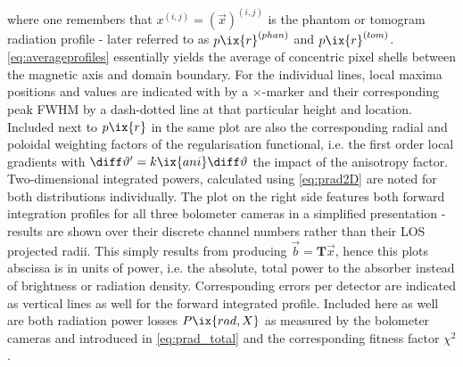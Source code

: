           where one remembers that $x^{\left(i,j\right)}=\left(\vec{x}\right)^{\left(i,j\right)}$ is the phantom or tomogram radiation profile - later referred to as $p\ix{r}^{\left(phan\right)}$ and $p\ix{r}^{\left(tom\right)}$. \cref{eq:averageprofiles} essentially yields the average of concentric pixel shells between the magnetic axis and domain boundary. For the individual lines, local maxima positions and values are indicated with by a $\times$-marker and their corresponding peak FWHM by a dash-dotted line at that particular height and location. Included next to $p\ix{r}$ in the same plot are also the corresponding radial and poloidal weighting factors of the regularisation functional, i.e. the first order local gradients with $\diff\vartheta^{\prime}=k\ix{ani}\diff\vartheta$ the impact of the anisotropy factor. Two-dimensional integrated powers, calculated using \cref{eq:prad2D} are noted for both distributions individually. The plot on the right side features both forward integration profiles for all three bolometer cameras in a simplified presentation - results are shown over their discrete channel numbers rather than their LOS projected radii. This simply results from producing $\vec{b}=\mathbf{T}\vec{x}$, hence this plots abscissa is in units of power, i.e. the absolute, total power to the absorber instead of brightness or radiation density. Corresponding errors per detector are indicated as vertical lines as well for the forward integrated profile. Included here as well are both radiation power losses $P\ix{rad,X}$ as measured by the bolometer cameras and introduced in \cref{eq:prad_total} and the corresponding fitness factor $\chi^{2}$.\\%

